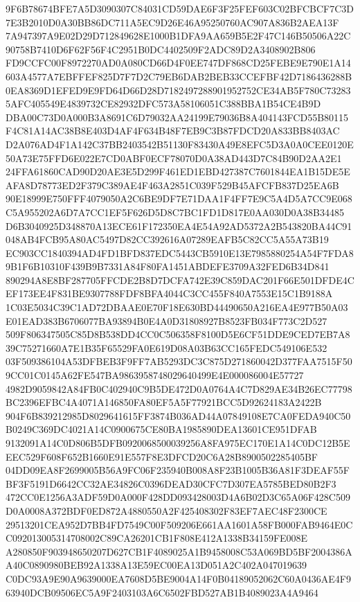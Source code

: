 \documentclass[UTF8,fontset=fandol,zihao=-4,a4paper]{ctexart}
\begin{document}
{{9F6B78674BFE7A5D3090307C84031CD59DAE6F3F25FEF603C02BFCBCF7C3D7E3B2010D0A30BB86DC711A5EC9D26E46A95250760AC907A836B2AEA13F
7A947397A9E02D29D712849628E1000B1DFA9AA659B5E2F47C146B50506A22C90758B7410D6F62F56F4C2951B0DC4402509F2ADC89D2A3408902B806
FD9CCFC00F8972270AD0A080CD66D4F0EE747DF868CD25FEBE9E790E1A14603A4577A7EBFFEF825D7F7D2C79EB6DAB2BEB33CCEFBF42D7186436288B
0EA8369D1EFED9E9FD64D66D28D7182497288901952752CE34AB5F780C732835AFC405549E4839732CE82932DFC573A58106051C388BBA1B54CE4B9D
DBA00C73D0A000B3A8691C6D79032AA24199E79036B8A404143FCD55B80115F4C81A14AC38B8E403D4AF4F634B48F7EB9C3B87FDCD20A833BB8403AC
D2A076AD4F1A142C37BB2403542B51130F83430A49E8EFC5D3A0A0CEE0120E50A73E75FFD6E022E7CD0ABF0ECF78070D0A38AD443D7C84B90D2AA2E1
24FFA61860CAD90D20AE3E5D299F461ED1EBD427387C7601844EA1B15DE5EAFA8D78773ED2F379C389AE4F463A2851C039F529B45AFCFB837D25EA6B
90E18999E750FFF4079050A2C6BE9DF7E71DAA1F4FF7E9C5A4D5A7CC9E068C5A955202A6D7A7CC1EF5F626D5D8C7BC1FD1D817E0AA030D0A38B34485
D6B3040925D348870A13ECE61F172350EA4E54A92AD5372A2B543820BA44C91048AB4FCB95A80AC5497D82CC392616A07289EAFB5C82CC5A55A73B19
EC903CC1840394AD4FD1BFD837EDC5443CB5910E13E7985880254A54F7FDA89B1F6B10310F439B9B7331A84F80FA1451ABDEFE3709A32FED6B34D841
890294A8E8BF287705FFCDE2B8D7DCFA742E39C859DAC201F66E501DFDE4CEF173EE4F831BE9307788FDF8BFA4044C3CC455F840A7553E15C1B9188A
1C03E5034C39C1AD72DBAAE0E70F18E630BD44490650A216EA4E977B50A03E01EAD383B6706077BA93894B0E4A0D31808927B8523FB034F773C2D527
509F806347505C85D8B538DD4CC0C506358F8100D5E6CF51DDE9CED7EB7A839C75271660A7E1B35F65529FA0E619D08A03B63CC165FEDC549106E532
03F509386104A53DFBEB3F9FF7AB5293DC3C875D271860042D377FAA7515F509CC01C0145A62FE547BA9863958748029640499E4E000086004E57727
4982D9059842A84FB0C402940C9B5DE472D0A0764A4C7D829AE34B26EC77798BC2396EFBC4A4071A146850FA80EF5A5F77921BCC5D92624183A2422B
904F6B839212985D8029641615FF3874B036AD44A07849108E7CA0FEDA940C50B0249C369DC4021A14C0900675CE80BA1985890DEA13601CE951DFAB
9132091A14C0D806B5DFB0920068500039256A8FA975EC170E1A14C0DC12B5EEEC529F608F652B1660E91E557F8E3DFCD20C6A28B8900502285405BF
04DD09EA8F2699005B56A9FC06F235940B008A8F23B1005B36A81F3DEAF55FBF3F5191D6642CC32AE34826C0396DEAD30CFC7D307EA5785BED80B2F3
472CC0E1256A3ADF59D0A000F428DD093428003D4A6B02D3C65A06F428C509D0A0008A372BDF0ED872A4880550A2F425408302F83EF7AEC48F2300CE
29513201CEA952D7BB4FD7549C00F509206E661AA1601A58FB000FAB9464E0CC092013005314708002C89CA26201CB1F808E412A1338B34159FE008E
A280850F903948650207D627CB1F4089025A1B9458008C53A069BD5BF2004386AA40C0890980BEB92A1338A13E59EC00EA13D051A2C402A047019639
C0DC93A9E90A9639000EA7608D5BE9004A14F0B04189052062C60A0436AE4F963940DCB09506EC5A9F2403103A6C6502FBD527AB1B4089023A4A9464
}}
\end{document}
